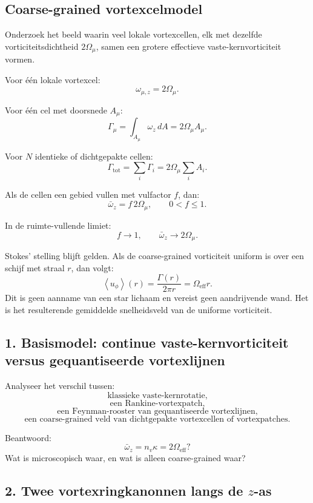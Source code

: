 \documentclass[11pt,a4paper]{article}
\begin{document}
\subsection{Coarse-grained vortexcelmodel}

Onderzoek het beeld waarin veel lokale vortexcellen, elk met dezelfde vorticiteitsdichtheid \(2\Omega_{\mu}\), samen een grotere effectieve vaste-kernvorticiteit vormen.

Voor één lokale vortexcel:
\[
\omega_{\mu,z}=2\Omega_{\mu}.
\]

Voor één cel met doorsnede \(A_{\mu}\):
\[
\Gamma_{\mu}
=
\int_{A_{\mu}}\omega_z\,dA
=
2\Omega_{\mu}A_{\mu}.
\]

Voor \(N\) identieke of dichtgepakte cellen:
\[
\Gamma_{\mathrm{tot}}
=
\sum_i\Gamma_i
=
2\Omega_{\mu}\sum_i A_i.
\]

Als de cellen een gebied vullen met vulfactor \(f\), dan:
\[
\bar{\omega}_z
=
f\,2\Omega_{\mu},
\qquad
0<f\leq1.
\]

In de ruimte-vullende limiet:
\[
f\rightarrow1,
\qquad
\bar{\omega}_z\rightarrow2\Omega_{\mu}.
\]

Stokes' stelling blijft gelden. Als de coarse-grained vorticiteit uniform is over een schijf met straal \(r\), dan volgt:
\[
\left\langle u_{\phi}\right\rangle(r)
=
\frac{\Gamma(r)}{2\pi r}
=
\Omega_{\mathrm{eff}}r.
\]
Dit is geen aanname van een star lichaam en vereist geen aandrijvende wand. Het is het resulterende gemiddelde snelheidsveld van de uniforme vorticiteit.

\subsection{1. Basismodel: continue vaste-kernvorticiteit versus gequantiseerde vortexlijnen}

Analyseer het verschil tussen:
\[
\text{klassieke vaste-kernrotatie,}
\]
\[
\text{een Rankine-vortexpatch,}
\]
\[
\text{een Feynman-rooster van gequantiseerde vortexlijnen,}
\]
\[
\text{een coarse-grained veld van dichtgepakte vortexcellen of vortexpatches.}
\]

Beantwoord:
\[
\bar{\omega}_z
=
n_v\kappa
=
2\Omega_{\mathrm{eff}}?
\]
Wat is microscopisch waar, en wat is alleen coarse-grained waar?

\subsection{2. Twee vortexringkanonnen langs de \(z\)-as}
\end{document}
